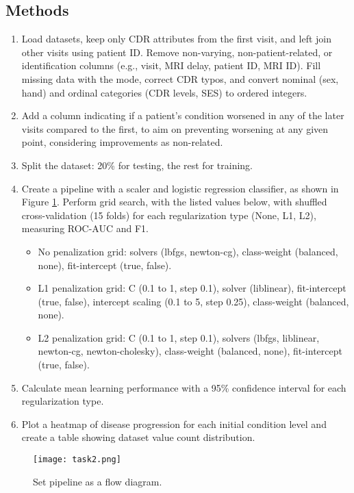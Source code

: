 \documentclass[a4paper,12pt]{article}
\begin{document}
\subsection{Methods}
\begin{enumerate}
    \item Load datasets, keep only CDR attributes from the first visit, and left join other visits using patient ID. Remove non-varying, non-patient-related, or identification columns (e.g., visit, MRI delay, patient ID, MRI ID). Fill missing data with the mode, correct CDR typos, and convert nominal (sex, hand) and ordinal categories (CDR levels, SES) to ordered integers.
    \item Add a column indicating if a patient's condition worsened in any of the later visits compared to the first, to aim on preventing worsening at any given point, considering improvements as non-related. 
    \item Split the dataset: 20\% for testing, the rest for training. 
    \item  Create a pipeline with a scaler and logistic regression classifier, as shown in Figure \ref{fig:pipeline-2}. Perform grid search, with the listed values below, with shuffled cross-validation (15 folds) for each regularization type (None, L1, L2), measuring ROC-AUC and F1. 
    \begin{itemize}
        \item No penalization grid: solvers (lbfgs, newton-cg), class-weight (balanced, none), fit-intercept (true, false).
        \item L1 penalization grid: C (0.1 to 1, step 0.1), solver (liblinear), fit-intercept (true, false), intercept scaling (0.1 to 5, step 0.25), class-weight (balanced, none).
        \item L2 penalization grid: C (0.1 to 1, step 0.1), solvers (lbfgs, liblinear, newton-cg, newton-cholesky), class-weight (balanced, none), fit-intercept (true, false).
    \end{itemize}
    \item Calculate mean learning performance with a 95\% confidence interval for each regularization type.
    \item Plot a heatmap of disease progression for each initial condition level and create a table showing dataset value count distribution.
\end{enumerate}

\begin{figure}[h]
  \centering
  \texttt{[image: task2.png]}
  \caption{Set pipeline as a flow diagram.}
  \label{fig:pipeline-2}
\end{figure}
\end{document}
